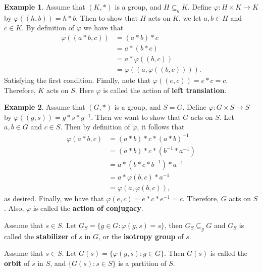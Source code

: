 \documentclass[12pt]{article}
\theoremstyle{definition}
\theoremstyle{definition}
\newtheorem{exmp}{Example}[section]
\begin{document}
      \begin{exmp}
        Assume that $(K, *)$ is a group, and $H\subseteq_g K$. Define
        $\varphi:H\times K\to K$ by $\varphi((h, b))=h*b$. Then to show that
        $H$ acts on $K$, we let $a, b\in H$ and $c\in K$. By definition of
        $\varphi$ we have that 
          \begin{equation*}
            \begin{split}
              \varphi((a*b, c))&=(a*b)*c \\
              &=a*(b*c) \\
              &=a*\varphi((b, c)) \\
              &=\varphi((a, \varphi((b, c)))).
            \end{split}
          \end{equation*}
        Satisfying the first condition. Finally, note that $\varphi((e,
        c))=e*c=c$. Therefore, $K$ acts on $S$. Here $\varphi$ is called the
        action of \textbf{left translation}.
      \end{exmp}
      \begin{exmp}
        Assume that $(G, *)$ is a group, and $S=G$. Define $\varphi:G\times
        S\to S$ by $\varphi((g, s))=g*s*g^{-1}$. Then we want to show that $G$
        acts on $S$. Let $a, b\in G$ and $c\in S$. Then by definition of
        $\varphi$, it follows that 
          \begin{equation*}
            \begin{split}
              \varphi(a*b, c)&=(a*b)*c*(a*b)^{-1} \\
              &=(a*b)*c*(b^{-1}*a^{-1}) \\
              &=a*(b*c*b^{-1})*a^{-1} \\
              &=a*\varphi(b, c)*a^{-1} \\
              &=\varphi(a, \varphi(b, c)),
            \end{split}
          \end{equation*}
        as desired. Finally, we have that $\varphi(e, c)=e*c*e^{-1}=c$.
        Therefore, $G$ acts on $S$. Also, $\varphi$ is called the
        \textbf{action of conjugacy}.
      \end{exmp} 
    Assume that $s\in S$. Let $G_S=\{g\in G:\varphi(g, s)=s\}$, then
    $G_S\subseteq_g G$ and $G_S$ is called the \textbf{stabilizer} of $s$ in
    $G$, or the \textbf{isotropy group} of $s$.\par\hspace{4mm} Assume that
    $s\in S$. Let $G(s)=\{\varphi(g, s):g\in G\}$. Then $G(s)$ is called the
    \textbf{orbit} of $s$ in $S$, and $\{G(s):s\in S\}$ is a partition of $S$. 
      
\end{document}
